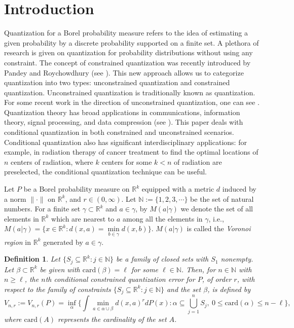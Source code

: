 \documentclass[12pt, reqno]{amsart}
\theoremstyle{plain}
\newtheorem{defi}[subsection]{Definition}
\theoremstyle{definition}
\newcommand{\uu}{\cup}%
\newcommand{\UU}{\bigcup}%
\newcommand{\ci}{\subseteq}%
\newcommand{\sci}{\subset}%
\newcommand{\set}[1]{\{#1\}}%
\newcommand{\ga}{\alpha}
\newcommand{\gb}{\beta}
\renewcommand{\gg}{\gamma}%
\newcommand{\tit}{\textit}%
\newcommand{\D}[1]{\mathbb{#1}}%
\newcommand{\te}{\text}%
\begin{document}
\section{Introduction}
Quantization for a Borel probability measure refers to the idea of estimating a given probability by a discrete probability supported on a finite set. 
A plethora of research is given on quantization for probability distributions without using any constraint. The concept of constrained quantization was recently introduced by Pandey and Roychowdhury (see \cite{PR1, PR2, PR3}). This new approach allows us to categorize quantization into two types: unconstrained quantization and constrained quantization. Unconstrained quantization is traditionally known as quantization. For some recent work in the direction of unconstrained quantization, one can see \cite{GL, DFG, DR, GL2, GL3, KNZ, PRRSS, P1, R1, R2, R3}. Quantization theory has broad applications in communications, information theory, signal processing, and data compression (see \cite{GG, GL1, GN, P, Z1, Z2}). This paper deals with conditional quantization in both constrained and unconstrained scenarios. Conditional quantization also has significant interdisciplinary applications: for example, in radiation therapy of cancer treatment to find the optimal locations of $n$ centers of radiation, where $k$ centers for some $k<n$ of radiation are preselected, the conditional quantization technique can be useful. 


Let $P$ be a Borel probability measure on $\D R^k$ equipped with a metric $d$ induced by a norm $\|\cdot\|$ on $\D R^k$, and $r \in (0, \infty)$. Let $\D N:=\set{1, 2, 3, \cdots}$ be the set of natural numbers. For a finite set $\gg \sci \D R^k$ and $a\in \gg$, by $M(a|\gg)$ we denote the set of all elements in $\D R^k$ which are nearest to $a$ among all the elements in $\gg$, i.e.,
$M(a|\gg)=\set{x \in \D R^k : d(x, a)=\mathop{\min}\limits_{b \in \gg}d(x, b)}.$
$M(a|\gg)$ is called the \tit{Voronoi region} in $\D R^k$ generated by $a\in \gg$.
\begin{defi}\label{EqVr111}
Let $\set{S_j\ci \D R^k: j\in \D N}$ be a family of closed sets with $S_1$ nonempty. Let $\gb\sci \D R^k$ be given with $\te{card}(\gb)=\ell$ for some $\ell\in \D N$. 
Then, for $n\in \D N$ with $n\geq \ell$, the \tit {$n$th conditional constrained quantization
error} for $P$, of order $r$, with respect to the family of constraints $\set{S_j\ci \D R^k: j\in \D N}$ and the set $\gb$, is defined by
\begin{equation}\label{EqVr121} 
V_{n, r}:=V_{n, r}(P)=\inf_{\ga} \Big\{\int \mathop{\min}\limits_{a\in\ga\uu\gb} d(x, a)^r dP(x) : \ga \ci \UU_{j=1}^n S_j, ~ 0\leq  \text{card}(\ga) \leq n-\ell \Big\},
\end{equation} 
where $\te{card}(A)$ represents the cardinality of the set $A$. 
\end{defi} 
\end{document}
